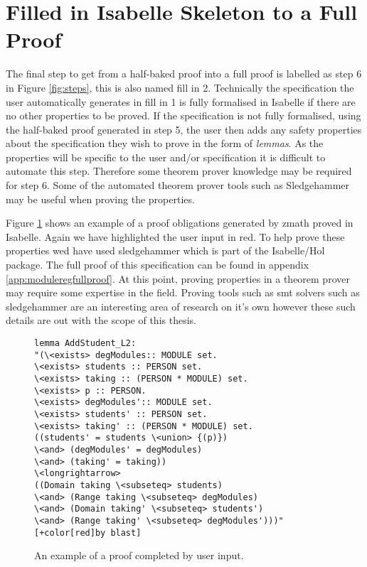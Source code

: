 \section{Filled in Isabelle Skeleton to a Full Proof}
\label{sec:isa2ful}

The final step to get from a half-baked proof into a full proof is labelled as step 6 in Figure \ref{fig:steps}, this is also named fill in 2. Technically the specification the user automatically generates in fill in 1 is fully formalised in Isabelle if there are no other properties to be proved. If the specification is not fully formalised, using the half-baked proof generated in step 5, the user then adds any safety properties about the specification they wish to prove in the form of \emph{lemmas}. As the properties will be specific to the user and/or specification it is difficult to automate this step. Therefore some theorem prover knowledge may be required for step 6. Some of the automated theorem prover tools such as Sledgehammer \cite{sledgehammer} may be useful when proving the properties.

Figure \ref{fig:exampleproof} shows an example of a proof obligations generated by \gls{zmath} proved in Isabelle. Again we have highlighted the user input in {\color{red}red}. To help prove these properties wed have used sledgehammer \cite{sledgehammer} which is part of the Isabelle/Hol package. The full proof of this specification can be found in appendix \ref{app:moduleregfullproof}. At this point, proving properties in a theorem prover may require some expertise in the field. Proving tools such as \gls{smt} solvers \cite{DeMoura:2011:SMT:1995376.1995394} such as sledgehammer are an interesting area of research on it's own however these such details are out with the scope of this thesis.

\begin{center}
\begin{figure}[H]
\centering
\begin{footnotesize}
\begin{BVerbatim}[commandchars=+\[\]]
lemma AddStudent_L2:
"(\<exists> degModules:: MODULE set.
\<exists> students :: PERSON set.
\<exists> taking :: (PERSON * MODULE) set.
\<exists> p :: PERSON.
\<exists> degModules':: MODULE set.
\<exists> students' :: PERSON set.
\<exists> taking' :: (PERSON * MODULE) set.
((students' = students \<union> {(p)}) 
\<and> (degModules' = degModules) 
\<and> (taking' = taking))
\<longrightarrow>
((Domain taking \<subseteq> students)
\<and> (Range taking \<subseteq> degModules)
\<and> (Domain taking' \<subseteq> students')
\<and> (Range taking' \<subseteq> degModules')))"
[+color[red]by blast]
\end{BVerbatim}
\end{footnotesize}
\caption{\label{fig:exampleproof} An example of a proof completed by user input.}
\end{figure}
\end{center}

